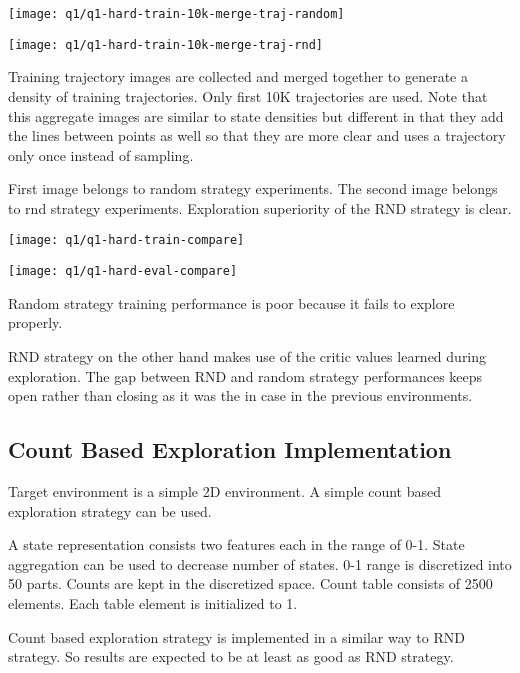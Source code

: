 \documentclass[11pt]{article}
\begin{document}
    \hspace*{-0.6in}
    \texttt{[image: q1/q1-hard-train-10k-merge-traj-random]}

    \hspace*{-0.6in}
    \texttt{[image: q1/q1-hard-train-10k-merge-traj-rnd]}

    Training trajectory images are collected and merged together to generate a density of training trajectories.
    Only first 10K trajectories are used.
    Note that this aggregate images are similar to state densities but different in that they add the lines between points as well so that they are more clear and uses a trajectory only once instead of sampling.

    First image belongs to random strategy experiments.
    The second image belongs to rnd strategy experiments.
    Exploration superiority of the RND strategy is clear.

    \hspace*{-0.6in}
    \texttt{[image: q1/q1-hard-train-compare]}

    \hspace*{-0.6in}
    \texttt{[image: q1/q1-hard-eval-compare]}

    Random strategy training performance is poor because it fails to explore properly.

    RND strategy on the other hand makes use of the critic values learned during exploration.
    The gap between RND and random strategy performances keeps open rather than closing as it was the in case in the previous environments.


    \subsection*{Count Based Exploration Implementation}

    Target environment is a simple 2D environment.
    A simple count based exploration strategy can be used.

    A state representation consists two features each in the range of 0-1.
    State aggregation can be used to decrease number of states.
    0-1 range is discretized into 50 parts.
    Counts are kept in the discretized space.
    Count table consists of 2500 elements.
    Each table element is initialized to 1.

    Count based exploration strategy is implemented in a similar way to RND strategy.
    So results are expected to be at least as good as RND strategy.
\end{document}
